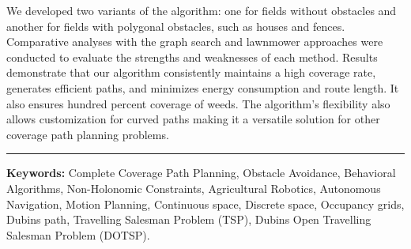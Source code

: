 We developed two variants of the algorithm: one for fields without obstacles and another for fields with polygonal obstacles, such as houses and fences. Comparative analyses with the graph search and lawnmower approaches were conducted to evaluate the strengths and weaknesses of each method. Results demonstrate that our algorithm consistently maintains a high coverage rate, generates efficient paths, and minimizes energy consumption and route length. It also ensures hundred percent coverage of weeds. The algorithm's flexibility also allows customization for curved paths making it a versatile solution for other coverage path planning problems.

\vspace*{6mm}   

\hrule

\vspace*{6mm}   

\textbf{Keywords:} Complete Coverage Path Planning, Obstacle Avoidance, Behavioral Algorithms, Non-Holonomic Constraints, Agricultural Robotics, Autonomous Navigation, Motion Planning, Continuous space, Discrete space, Occupancy grids, Dubins path, Travelling Salesman Problem (TSP), Dubins Open Travelling Salesman Problem (DOTSP). 

